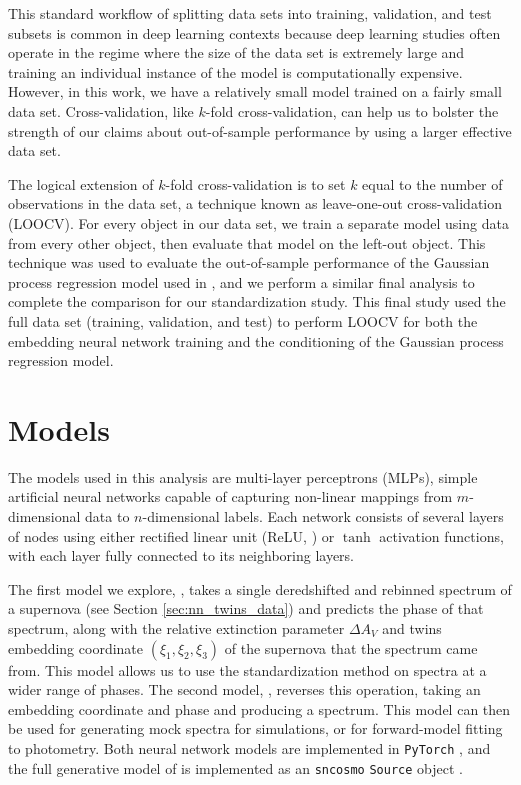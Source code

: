 This standard workflow of splitting data sets into training, validation, and test subsets is common in deep learning contexts because deep learning studies often operate in the regime where the size of the data set is extremely large and training an individual instance of the model is computationally expensive. However, in this work, we have a relatively small model trained on a fairly small data set. Cross-validation, like $k$-fold cross-validation, can help us to bolster the strength of our claims about out-of-sample performance by using a larger effective data set.

The logical extension of $k$-fold cross-validation is to set $k$ equal to the number of observations in the data set, a technique known as leave-one-out cross-validation (LOOCV). For every object in our data set, we train a separate model using data from every other object, then evaluate that model on the left-out object. This technique was used to evaluate the out-of-sample performance of the Gaussian process regression model used in , and we perform a similar final analysis to complete the comparison for our standardization study. This final study used the full data set (training, validation, and test) to perform LOOCV for both the \stoe{} embedding neural network training and the conditioning of the Gaussian process regression model.

\section{Models} \label{sec:model}
The models used in this analysis are multi-layer perceptrons (MLPs), simple artificial neural networks capable of capturing non-linear mappings from $m$-dimensional data to $n$-dimensional labels. Each network consists of several layers of nodes using either rectified linear unit (ReLU, \citet{nair_rectified_2010}) or $\tanh$ activation functions, with each layer fully connected to its neighboring layers.

The first model we explore, \stoe, takes a single deredshifted and rebinned spectrum of a supernova (see Section \ref{sec:nn_twins_data}) and predicts the phase of that spectrum, along with the relative extinction parameter $\Delta A_V$ and twins embedding coordinate $(\xi_1, \xi_2, \xi_3)$ of the supernova that the spectrum came from. This model allows us to use the  standardization method on spectra at a wider range of phases. The second model, \etos, reverses this operation, taking an embedding coordinate and phase and producing a spectrum. This model can then be used for generating mock spectra for simulations, or for forward-model fitting to photometry. Both neural network models are implemented in \texttt{PyTorch} \citep{paszke_pytorch_2019}, and the full generative model of \etos{} is implemented as an \texttt{sncosmo} \texttt{Source} object \citep{barbary_sncosmo_2015}.

